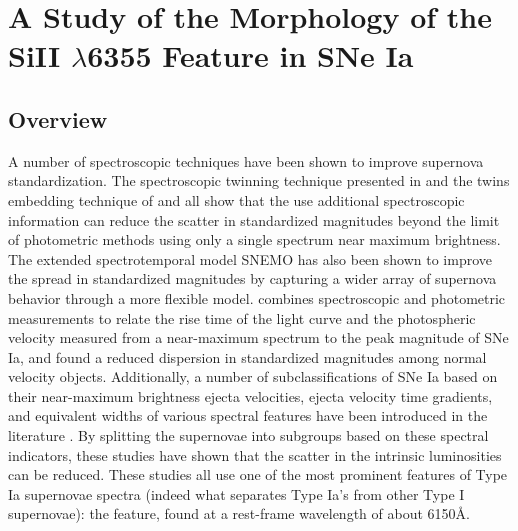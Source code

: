 \chapter{A Study of the Morphology of the SiII \texorpdfstring{$\lambda$}{}6355 Feature in SNe Ia}
\label{chap:si_feat_pca}

\section{Overview}
\label{intro}

A number of spectroscopic techniques have been shown to improve supernova standardization. The spectroscopic twinning technique presented in \citet{fakhouri_improving_2015} and the twins embedding technique of \citet{boone_twins_2020a} and \citet{boone_twins_2020b} all show that the use additional spectroscopic information can reduce the scatter in standardized magnitudes beyond the limit of photometric methods using only a single spectrum near maximum brightness. The extended spectrotemporal model SNEMO \citep{saunders_snemo_2018} has also been shown to improve the spread in standardized magnitudes by capturing a wider array of supernova behavior through a more flexible model. \citet{zheng_empirical_2018} combines spectroscopic and photometric measurements to relate the rise time of the light curve and the photospheric velocity measured from a near-maximum spectrum to the peak magnitude of SNe Ia, and found a reduced dispersion in standardized magnitudes among normal velocity objects. Additionally, a number of subclassifications of SNe Ia based on their near-maximum brightness ejecta velocities, ejecta velocity time gradients, and equivalent widths of various spectral features have been introduced in the literature \citep{branch_comparative_2006, benetti_diversity_2005, wang_improved_2009, wang_evidence_2013}. By splitting the supernovae into subgroups based on these spectral indicators, these studies have shown that the scatter in the intrinsic luminosities can be reduced. These studies all use one of the most prominent features of Type Ia supernovae spectra (indeed what separates Type Ia's from other Type I supernovae): the \siliconii{} feature, found at a rest-frame wavelength of about 6150\AA. 

